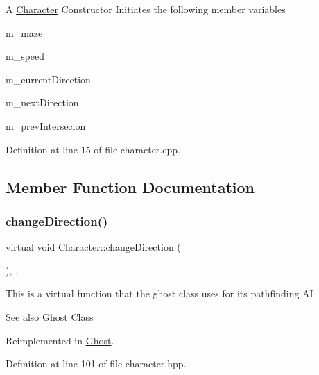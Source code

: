 A \hyperlink{class_character}{Character} Constructor Initiates the following member variables
\begin{DoxyItemize}
\item m\+\_\+maze
\item m\+\_\+speed
\item m\+\_\+current\+Direction
\item m\+\_\+next\+Direction
\item m\+\_\+prev\+Intersecion 
\end{DoxyItemize}

Definition at line 15 of file character.\+cpp.



\subsection{Member Function Documentation}
\mbox{\label{class_character_ab4c0dc6f72c78607b921cf312e10ed35}} 
\subsubsection{\texorpdfstring{change\+Direction()}{changeDirection()}}
{\footnotesize\ttfamily virtual void Character\+::change\+Direction (\begin{DoxyParamCaption}{ }\end{DoxyParamCaption})\hspace{0.3cm}{\ttfamily [inline]}, {\ttfamily [protected]}, {\ttfamily [virtual]}}

This is a virtual function that the ghost class uses for it\textquotesingle{}s pathfinding AI

\begin{DoxySeeAlso}{See also}
\hyperlink{class_ghost}{Ghost} Class 
\end{DoxySeeAlso}


Reimplemented in \hyperlink{class_ghost_a08831fa01afa61f91365ce82cf33bf1b}{Ghost}.



Definition at line 101 of file character.\+hpp.

\mbox{\label{class_character_ab267ab6083ac0b311fc86754ceaed269}} 

